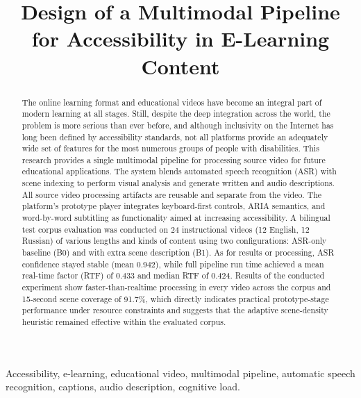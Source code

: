 ﻿\documentclass[conference]{IEEEtran}
\begin{document}
\title{Design of a Multimodal Pipeline for Accessibility in E-Learning Content}

\author{
}

\maketitle

\begin{abstract}
The online learning format and educational videos have become an integral part of modern learning at all stages. Still, despite the deep integration across the world, the problem is more serious than ever before, and although inclusivity on the Internet has long been defined by accessibility standards, not all platforms provide an adequately wide set of features for the most numerous groups of people with disabilities. This research provides a single multimodal pipeline for processing source video for future educational applications. The system blends automated speech recognition (ASR) with scene indexing to perform visual analysis and generate written and audio descriptions. All source video processing artifacts are reusable and separate from the video. The platform's prototype player integrates keyboard-first controls, ARIA semantics, and word-by-word subtitling as functionality aimed at increasing accessibility. A bilingual test corpus evaluation was conducted on 24 instructional videos (12 English, 12 Russian) of various lengths and kinds of content using two configurations: ASR-only baseline (B0) and with extra scene description (B1). As for results or processing, ASR confidence stayed stable (mean 0.942), while full pipeline run time achieved a mean real-time factor (RTF) of 0.433 and median RTF of 0.424. Results of the conducted experiment show faster-than-realtime processing in every video across the corpus and 15-second scene coverage of 91.7\%, which directly indicates practical prototype-stage performance under resource constraints and suggests that the adaptive scene-density heuristic remained effective within the evaluated corpus.

\end{abstract}

\begin{IEEEkeywords}
Accessibility, e-learning, educational video, multimodal pipeline, automatic speech recognition, captions, audio description, cognitive load.
\end{IEEEkeywords}
\end{document}
